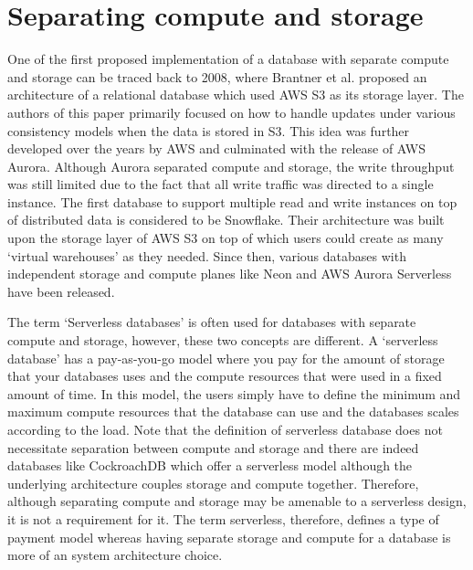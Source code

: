 \section{Separating compute and storage}\label{sec:serverlessArch}
One of the first proposed implementation of a database with separate compute and
storage can be traced back to 2008\cite{brantner2008building}, where Brantner et
al. proposed an architecture of a relational database which used AWS S3 as its
storage layer. The authors of this paper primarily focused on how to handle
updates under various consistency models when the data is stored in S3. This
idea was further developed over the years by AWS and culminated with the release
of AWS Aurora\cite{verbitski2017amazon}. Although Aurora separated compute and
storage, the write throughput was still limited due to the fact that all write
traffic was directed to a single instance. The first database to support
multiple read and write instances on top of distributed data is considered to be
Snowflake\cite{dageville2016snowflake}. Their architecture was built upon the
storage layer of AWS S3 on top of which users could create as many `virtual
warehouses' as they needed. Since then, various databases with independent
storage and compute planes like Neon\cite{neonPostgres} and AWS Aurora
Serverless\cite{auroraServerless} have been released.

\medskip
The term `Serverless databases' is often used for databases with separate
compute and storage, however, these two concepts are different. A `serverless
database' has a pay-as-you-go model where you pay for the amount of storage that
your databases uses and the compute resources that were used in a fixed amount
of time. In this model, the users simply have to define the minimum and maximum
compute resources that the database can use and the databases scales according
to the load. Note that the definition of serverless database does not
necessitate separation between compute and storage and there are indeed
databases like CockroachDB\cite{taft2020cockroachdb} which offer a serverless
model although the underlying architecture couples storage and compute together.
Therefore, although separating compute and storage may be amenable to a
serverless design, it is not a requirement for it. The term serverless,
therefore, defines a type of payment model whereas having separate storage and
compute for a database is more of an system architecture choice. 

